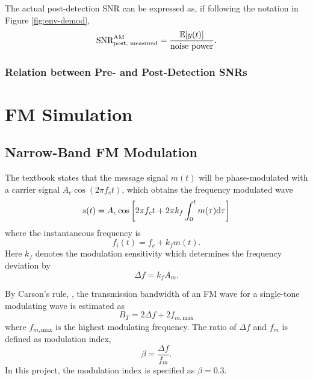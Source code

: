 \documentclass[../ECE459FinalProjectReport.tex]{subfiles}
\begin{document}
The actual post-detection SNR can be expressed as, if following the notation in Figure \ref{fig:env-demod},
\begin{equation}
    \text{SNR}_{\text{post, measured}}^{\text{AM}} = \frac{\mathbb{E}[y(t)]}{\text{noise power}}.
\end{equation}


\subsubsection{Relation between Pre- and Post-Detection SNRs}

\section{FM Simulation}
\subsection{Narrow-Band FM Modulation}
The textbook \cite[Sec. 4.1]{haykinIntroductionAnalogDigital2007} states that the message signal $m(t)$ will be phase-modulated with a carrier signal $A_c \cos(2\pi f_c t)$, which obtains the frequency modulated wave
\begin{equation}
    s(t) = A_c \cos\left[ 2\pi f_c t + 2\pi k_f \int_0^{t} m(\tau) \mathrm{d}\tau \right]
\end{equation}
where the instantaneous frequency is
\begin{equation}
    f_i(t) = f_c + k_f m(t).
\end{equation}
Here $k_f$ denotes the modulation sensitivity which determines the frequency deviation by
\begin{equation}
    \Delta f = k_f A_m.
\end{equation}

By Carson's rule, \cites[Sec. 4.6]{haykinIntroductionAnalogDigital2007}{CarsonRule2017}, the transmission bandwidth of an FM wave for a single-tone modulating wave is estimated as
\begin{equation}
    B_T = 2\Delta f + 2f_{m,\mathrm{max}}
\end{equation}
where $f_{m,\mathrm{max}}$ is the highest modulating frequency. The ratio of $\Delta f$ and $f_m$ is defined as modulation index,
\begin{equation}
    \beta = \frac{\Delta f}{f_m}.
\end{equation}
In this project, the modulation index is specified as $\beta=0.3$.
\end{document}
